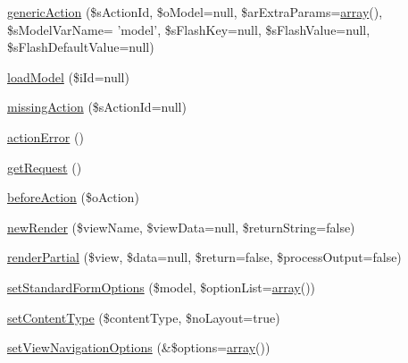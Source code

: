 \begin{DoxyCompactItemize}
\item 
\hyperlink{classCPSController_a5d552693681c1d3c932a6ae5fbb56ac5}{genericAction} (\$sActionId, \$oModel=null, \$arExtraParams=\hyperlink{list_8php_aa3205d038c7f8feb5c9f01ac4dfadc88}{array}(), \$sModelVarName= 'model', \$sFlashKey=null, \$sFlashValue=null, \$sFlashDefaultValue=null)
\item 
\hyperlink{classCPSController_a746b3a617d7e9d1c0012aa471cf25325}{loadModel} (\$iId=null)
\item 
\hyperlink{classCPSController_a21b71f8b9833d55edd503961ac3f4280}{missingAction} (\$sActionId=null)
\item 
\hyperlink{classCPSController_a8471fa2c95307d608c34f15dae47d254}{actionError} ()
\item 
\hyperlink{classCPSController_adf1a35ad20e475c59cc0967d5764aa22}{getRequest} ()
\item 
\hyperlink{classCPSController_a17b3b891c90dd35778e9596ce304ddd1}{beforeAction} (\$oAction)
\item 
\hyperlink{classCPSController_acaf53d84b70927098a40b8e626985146}{newRender} (\$viewName, \$viewData=null, \$returnString=false)
\item 
\hyperlink{classCPSController_a8324b095d3faa196d784f84a3f0cef25}{renderPartial} (\$view, \$data=null, \$return=false, \$processOutput=false)
\item 
\hyperlink{classCPSController_ae926a613a7702bb749e974f35a462d60}{setStandardFormOptions} (\$model, \$optionList=\hyperlink{list_8php_aa3205d038c7f8feb5c9f01ac4dfadc88}{array}())
\item 
\hyperlink{classCPSController_a136cf4fecb17df00146f6889ffdbccee}{setContentType} (\$contentType, \$noLayout=true)
\item 
\hyperlink{classCPSController_a592bdbc48efc56a00e5b49582db7c09f}{setViewNavigationOptions} (\&\$options=\hyperlink{list_8php_aa3205d038c7f8feb5c9f01ac4dfadc88}{array}())
\end{DoxyCompactItemize}
